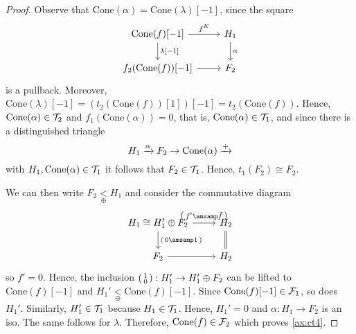\begin{proof}
  Observe that $\mathrm{Cone}(\alpha)=\mathrm{Cone}(\lambda)[-1]$, since
  the square
  \begin{equation*}
    \begin{tikzcd}
      \mathrm{Cone}(f)[-1]\arrow{r}{f^K}\arrow{d}{\lambda[-1]}
        & H_1\arrow{d}{\alpha} \\
       f_2(\mathrm{Cone}(f))[-1]\arrow{r}
        & F_2
    \end{tikzcd}
  \end{equation*}
  is a pullback. Moreover, $\mathrm{Cone}(\lambda)[-1] = ( t_2(\mathrm{Cone}(f))[1])[-1]
  = t_2(\mathrm{Cone}(f))$. Hence, $\mathrm{Cone}(\alpha)\in \mathcal{T}_2$ and
  $ f_1(\mathrm{Cone}(\alpha))=0$, that is,
  $\mathrm{Cone}(\alpha)\in\mathcal{T}_1$, and since there is a distinguished triangle
  \begin{equation*}
    H_1\xrightarrow{\alpha} F_2\to \mathrm{Cone}(\alpha)\xrightarrow{+}
  \end{equation*}
  with $H_1,\mathrm{Cone}(\alpha)\in\mathcal{T}_1$ it follows that
  $F_2\in\mathcal{T}_1$. Hence, $ t_1(F_2)\cong F_2$.

  We can then write $F_2\underset{\oplus}{<}H_1$ and consider the commutative diagram
  \begin{equation*}
    \begin{tikzcd}
      H_1 \cong H_1'\oplus F_2\arrow{r}{
        \begin{psmallmatrix}
          f' \amsamp \tilde{f}
        \end{psmallmatrix}
      }\arrow{d}{
        \begin{psmallmatrix}
          0 \amsamp 1
        \end{psmallmatrix}
      }
        & H_2\arrow[equal]{d}\\
      F_2\arrow{r}
        & H_2
    \end{tikzcd}
  \end{equation*}
  so $f'=0$. Hence, the inclusion $
  \begin{psmallmatrix}
    1 \\ 0
  \end{psmallmatrix}:H_1'\to H_1'\oplus F_2$ can be lifted to
  $\mathrm{Cone}(f)[-1]$ and $H_1'\underset{\oplus}{<}\mathrm{Cone}(f)[-1]$.
  Since $\mathrm{Cone}(f)[-1]\in \mathcal{F}_1$, so does $H_1'$. Similarly,
  $H_1'\in\mathcal{T}_1$ because $H_1\in\mathcal{T}_1$. Hence, $H_1'=0$ and $\alpha:H_1\to F_2$ is an iso.
  The same follows for $\lambda$. Therefore, $\mathrm{Cone}(f)\in\mathcal{F}_2$ which
  proves \ref{ax:ct4}.
\end{proof}


